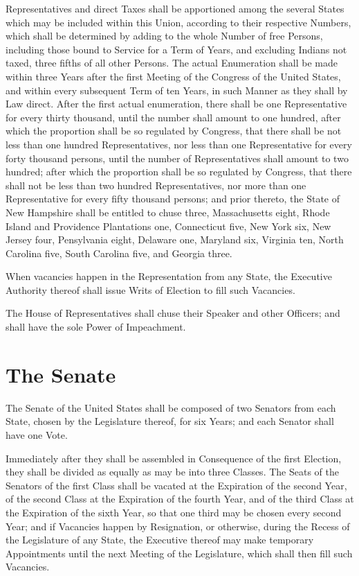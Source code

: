 \documentclass{constitution}
\begin{document}
Representatives and direct Taxes shall be apportioned
among the several States which may be included within this Union,
according to their respective Numbers,
which shall be determined by adding to the whole Number of free Persons,
including those bound to Service for a Term of Years,
and excluding Indians not taxed,
three fifths of all other Persons.
The actual Enumeration shall be made within three Years
after the first Meeting of the Congress of the United States,
and within every subsequent Term of ten Years,
in such Manner as they shall by Law direct.
After the first actual enumeration,
there shall be one Representative for every thirty thousand,
	until the number shall amount to one hundred,
after which the proportion shall be so regulated by Congress,
	that there shall be not less than one hundred Representatives,
	nor less than one Representative for every forty thousand persons,
	until the number of Representatives shall amount to two hundred;
after which the proportion shall be so regulated by Congress,
	that there shall not be less than two hundred Representatives,
	nor more than one Representative for every fifty thousand persons;
and prior thereto,
the State of New Hampshire shall be entitled to chuse three,
	Massachusetts eight,
	Rhode Island and Providence Plantations one,
	Connecticut five,
	New York six,
	New Jersey four,
	Pensylvania eight,
	Delaware one,
	Maryland six,
	Virginia ten,
	North Carolina five,
	South Carolina five,
and	Georgia three.

When vacancies happen in the Representation from any State,
the Executive Authority thereof shall issue Writs of Election to fill such Vacancies.

The House of Representatives shall chuse their Speaker and other Officers;
and shall have the sole Power of Impeachment.

\section{The Senate}
The Senate of the United States shall be composed of two Senators from each State,
chosen by the Legislature thereof, for six Years;
and each Senator shall have one Vote.

Immediately after they shall be assembled in Consequence of the first Election,
they shall be divided as equally as may be into three Classes.
The Seats of the Senators of the first Class shall be vacated at the Expiration of the second Year,
of the second Class at the Expiration of the fourth Year,
and of the third Class at the Expiration of the sixth Year,
so that one third may be chosen every second Year;
and if Vacancies happen by Resignation, or otherwise,
during the Recess of the Legislature of any State,
the Executive thereof may make temporary Appointments
until the next Meeting of the Legislature,
which shall then fill such Vacancies.
\end{document}

